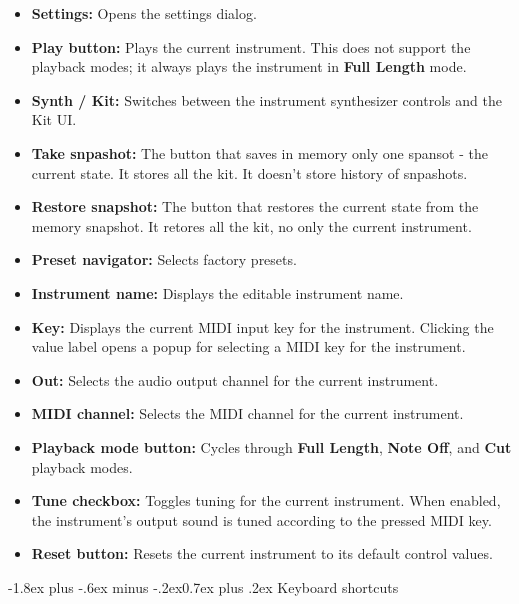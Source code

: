 \documentclass[11pt]{article}
\makeatletter
\providecommand{\tightlist}{%
  \setlength{\itemsep}{0pt}\setlength{\parskip}{0pt}}
\renewcommand{\subsubsection}{\@startsection{subsubsection}{3}{\z@}%
  {-1.8ex plus -.6ex minus -.2ex}{0.7ex plus .2ex}%
  {\normalfont\normalsize\bfseries\sffamily\color{GKBlue}}}
\makeatother
\begin{document}
\begin{itemize}
\tightlist
\item
  \textbf{Settings:} Opens the settings dialog.
\item
  \textbf{Play button:} Plays the current instrument. This does not
  support the playback modes; it always plays the instrument in
  \textbf{Full Length} mode.
\item
  \textbf{Synth / Kit:} Switches between the instrument synthesizer
  controls and the Kit UI.
\item
  \textbf{Take snpashot:} The button that saves in memory only one spansot - the current state. It stores all the kit.
  It doesn't store history of snpashots.
\item
  \textbf{Restore snapshot:} The button that restores the current state from the memory snapshot. It retores all the kit,
  no only the current instrument.
\item
  \textbf{Preset navigator:} Selects factory presets.
\item
  \textbf{Instrument name:} Displays the editable instrument name.
\item
  \textbf{Key:} Displays the current MIDI input key for the instrument.
  Clicking the value label opens a popup for selecting a MIDI key for
  the instrument.
\item
  \textbf{Out:} Selects the audio output channel for the current
  instrument.
\item
  \textbf{MIDI channel:} Selects the MIDI channel for the current
  instrument.
\item
  \textbf{Playback mode button:} Cycles through \textbf{Full Length},
  \textbf{Note Off}, and \textbf{Cut} playback modes.
\item
  \textbf{Tune checkbox:} Toggles tuning for the current instrument.
  When enabled, the instrument's output sound is tuned according to the
  pressed MIDI key.
\item
  \textbf{Reset button:} Resets the current instrument to its default
  control values.
\end{itemize}

\subsubsection{Keyboard shortcuts}\label{keyboard-shortcuts}
\end{document}
